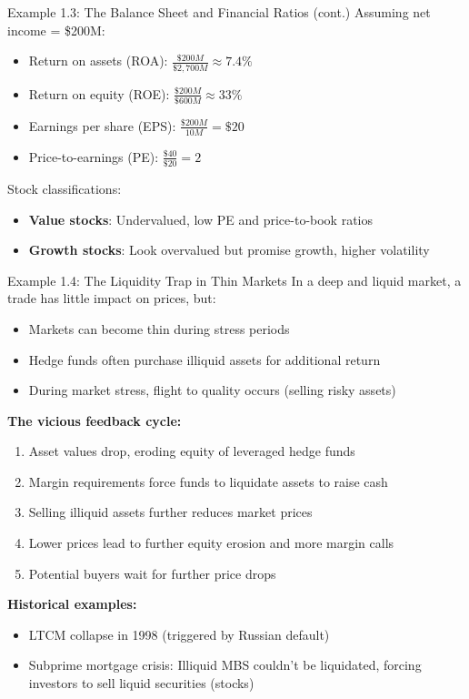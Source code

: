 \documentclass[10pt,handout]{beamer}
\begin{document}
\begin{frame}{Example 1.3: The Balance Sheet and Financial Ratios (cont.)}
  Assuming net income = \$200M:
  
  \begin{itemize}
    \item Return on assets (ROA): $\tfrac{\$200M}{\$2,700M} \approx 7.4\%$
    \item Return on equity (ROE): $\tfrac{\$200M}{\$600M} \approx 33\%$
    \item Earnings per share (EPS): $\tfrac{\$200M}{10M} = \$20$
    \item Price-to-earnings (PE): $\tfrac{\$40}{\$20} = 2$
  \end{itemize}
  
  \pause
  Stock classifications:
  \begin{itemize}
    \item \textbf{Value stocks}: Undervalued, low PE and price-to-book ratios
    \item \textbf{Growth stocks}: Look overvalued but promise growth, higher volatility
  \end{itemize}
\end{frame}

\begin{frame}{Example 1.4: The Liquidity Trap in Thin Markets}
  In a deep and liquid market, a trade has little impact on prices, but:
  \begin{itemize}
    \item Markets can become thin during stress periods
    \item Hedge funds often purchase illiquid assets for additional return
    \item During market stress, flight to quality occurs (selling risky assets)
  \end{itemize}
  
  \pause
  \textbf{The vicious feedback cycle:}
  \begin{enumerate}
    \item Asset values drop, eroding equity of leveraged hedge funds
    \item Margin requirements force funds to liquidate assets to raise cash
    \item Selling illiquid assets further reduces market prices
    \item Lower prices lead to further equity erosion and more margin calls
    \item Potential buyers wait for further price drops
  \end{enumerate}
  
  \pause
  \textbf{Historical examples:}
  \begin{itemize}
    \item LTCM collapse in 1998 (triggered by Russian default)
    \item Subprime mortgage crisis: Illiquid MBS couldn't be liquidated,
          forcing investors to sell liquid securities (stocks)
  \end{itemize}
\end{frame}
\end{document}
